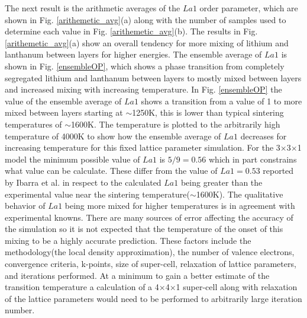 \documentclass[aps,pre,reprint,superscriptaddress,showkeys]{revtex4-2}
\begin{document}
The next result is the arithmetic averages of the $La1$  order parameter, which are  shown in Fig. \ref{arithemetic_avg}(a) along with the number of samples used to determine each value in Fig. \ref{arithemetic_avg}(b). The results in Fig. \ref{arithemetic_avg}(a) show an overall tendency for more mixing of lithium and lanthanum between layers for higher energies. The ensemble average of $La1$ is shown in Fig. \ref{ensembleOP}, which shows a phase transition from completely segregated lithium and lanthanum between layers to mostly mixed between layers and increased mixing with increasing temperature. In Fig. \ref{ensembleOP} the value of the ensemble average of $La1$ shows a transition from a value of 1 to more mixed between layers starting at $\sim$1250K, this is lower than typical sintering temperatures of $\sim$1600K. The temperature is plotted to the arbitrarily high temperature of 4000K to show how the ensemble average of $La1$ decreases for increasing temperature for this fixed lattice parameter simulation. For the 3$\times$3$\times$1 model the minimum possible value of $La1$ is $5/9 = 0.56$ which in part constrains what value can be calculate. These differ from the value of $La1=0.53$ reported by Ibarra et al. \cite{P4mmmstrucuture}  in respect to the calculated $La1$ being greater than the  experimental value near the sintering temperature($\sim$1600K). The qualitative behavior of $La1$ being more mixed for higher temperatures is in agreement with experimental knowns. There are many sources of error affecting the accuracy of the simulation so it is not expected that the temperature of the onset of this mixing to be a highly accurate prediction.  These factors include the methodology(the local density approximation), the number of valence electrons, convergence criteria, k-points, size of super-cell, relaxation of lattice parameters,  and iterations performed.  At a minimum to gain a better estimate of the transition temperature a calculation of a 4$\times$4$\times$1 super-cell along with relaxation of the lattice parameters would need to be performed to arbitrarily large iteration number. 
\end{document}
